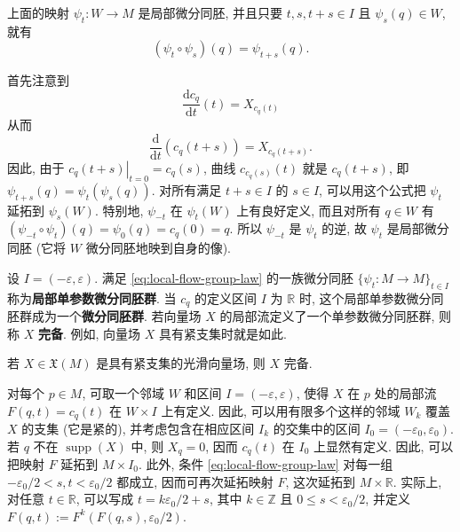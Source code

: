 \begin{RiemannProposition}\label{prop:composition-of-local-flows}
上面的映射 $\psi_t:W\to M$ 是局部微分同胚, 并且只要 $t,s,t+s\in I$ 且 $\psi_s(q)\in W$, 就有
\begin{equation}\label{eq:local-flow-group-law}
  (\psi_t\circ\psi_s)(q)=\psi_{t+s}(q).
\end{equation}
\end{RiemannProposition}

\begin{RiemannProof}
首先注意到
\[
  \frac{\mathrm{d}c_q}{\mathrm{d}t}(t)=X_{c_q(t)}
\]
从而
\[
  \frac{\mathrm{d}}{\mathrm{d}t}(c_q(t+s))=X_{c_q(t+s)}.
\]
因此, 由于 $\left.c_q(t+s)\right|_{t=0}=c_q(s)$, 曲线 $c_{c_q(s)}(t)$ 就是 $c_q(t+s)$, 即 $\psi_{t+s}(q)=\psi_t(\psi_s(q))$. 对所有满足 $t+s\in I$ 的 $s\in I$, 可以用这个公式把 $\psi_t$ 延拓到 $\psi_s(W)$. 特别地, $\psi_{-t}$ 在 $\psi_t(W)$ 上有良好定义, 而且对所有 $q\in W$ 有 $(\psi_{-t}\circ\psi_t)(q)=\psi_0(q)=c_q(0)=q$. 所以 $\psi_{-t}$ 是 $\psi_t$ 的逆, 故 $\psi_t$ 是局部微分同胚 (它将 $W$ 微分同胚地映到自身的像).
\end{RiemannProof}

设 $I=(-\varepsilon,\varepsilon)$. 满足 \eqref{eq:local-flow-group-law} 的一族微分同胚 $\{\psi_t:M\to M\}_{t\in I}$ 称为\label{idx:local-one-parameter-group-of-diffeomorphisms}\textbf{局部单参数微分同胚群}. 当 $c_q$ 的定义区间 $I$ 为 $\mathbb{R}$ 时, 这个局部单参数微分同胚群成为一个\textbf{微分同胚群}. 若向量场 $X$ 的局部流定义了一个单参数微分同胚群, 则称 $X$ \textbf{完备}. 例如, 向量场 $X$ 具有紧支集时就是如此.

\begin{RiemannTheorem}\label{thm:compactly-supported-vector-fields-are-complete}
若 $X\in\mathfrak{X}(M)$ 是具有紧支集的光滑向量场, 则 $X$ 完备.
\end{RiemannTheorem}

\begin{RiemannProof}
对每个 $p\in M$, 可取一个邻域 $W$ 和区间 $I=(-\varepsilon,\varepsilon)$, 使得 $X$ 在 $p$ 处的局部流 $F(q,t)=c_q(t)$ 在 $W\times I$ 上有定义. 因此, 可以用有限多个这样的邻域 $W_k$ 覆盖 $X$ 的支集 (它是紧的), 并考虑包含在相应区间 $I_k$ 的交集中的区间 $I_0=(-\varepsilon_0,\varepsilon_0)$. 若 $q$ 不在 $\operatorname{supp}(X)$ 中, 则 $X_q=0$, 因而 $c_q(t)$ 在 $I_0$ 上显然有定义. 因此, 可以把映射 $F$ 延拓到 $M\times I_0$. 此外, 条件 \eqref{eq:local-flow-group-law} 对每一组 $-\varepsilon_0/2<s,t<\varepsilon_0/2$ 都成立, 因而可再次延拓映射 $F$, 这次延拓到 $M\times\mathbb{R}$. 实际上, 对任意 $t\in\mathbb{R}$, 可以写成 $t=k\varepsilon_0/2+s$, 其中 $k\in\mathbb{Z}$ 且 $0\leq s<\varepsilon_0/2$, 并定义 $F(q,t):=F^k(F(q,s),\varepsilon_0/2)$.
\end{RiemannProof}

